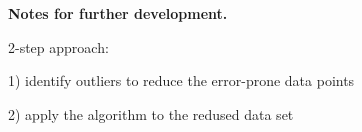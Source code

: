 \label{chapter:socp}

\textbf{Notes for further development.}

2-step approach:

1) identify outliers to reduce the error-prone data points

2) apply the algorithm  to the redused data set